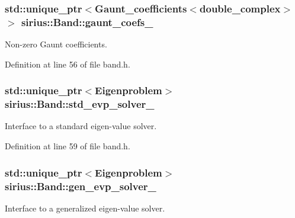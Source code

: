\subsubsection[{gaunt\+\_\+coefs\+\_\+}]{\setlength{\rightskip}{0pt plus 5cm}std\+::unique\+\_\+ptr$<${\bf Gaunt\+\_\+coefficients}$<$double\+\_\+complex$>$ $>$ sirius\+::\+Band\+::gaunt\+\_\+coefs\+\_\+\hspace{0.3cm}{\ttfamily [private]}}\label{classsirius_1_1_band_a20c18e018c120ad6f901d046720decce}


Non-\/zero Gaunt coefficients. 



Definition at line 56 of file band.\+h.

\hypertarget{classsirius_1_1_band_aa8e787f36f24f395d19bf617f3165398}{}
\subsubsection[{std\+\_\+evp\+\_\+solver\+\_\+}]{\setlength{\rightskip}{0pt plus 5cm}std\+::unique\+\_\+ptr$<${\bf Eigenproblem}$>$ sirius\+::\+Band\+::std\+\_\+evp\+\_\+solver\+\_\+\hspace{0.3cm}{\ttfamily [private]}}\label{classsirius_1_1_band_aa8e787f36f24f395d19bf617f3165398}


Interface to a standard eigen-\/value solver. 



Definition at line 59 of file band.\+h.

\hypertarget{classsirius_1_1_band_a65ee266c73c0f8da01fc25db867ad119}{}
\subsubsection[{gen\+\_\+evp\+\_\+solver\+\_\+}]{\setlength{\rightskip}{0pt plus 5cm}std\+::unique\+\_\+ptr$<${\bf Eigenproblem}$>$ sirius\+::\+Band\+::gen\+\_\+evp\+\_\+solver\+\_\+\hspace{0.3cm}{\ttfamily [private]}}\label{classsirius_1_1_band_a65ee266c73c0f8da01fc25db867ad119}


Interface to a generalized eigen-\/value solver. 



